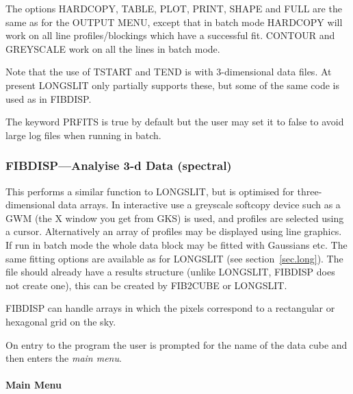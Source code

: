\documentclass[11pt,twoside]{article}
\newcommand{\xlabel}[1]{}
\begin{document}
The options HARDCOPY, TABLE, PLOT, PRINT, SHAPE and FULL are the same
as for the OUTPUT MENU, except that in batch mode HARDCOPY
will work on all line profiles/blockings which have a successful fit.
CONTOUR and GREYSCALE work on all the lines in batch mode.

Note that the use of TSTART and TEND is with 3-dimensional data files.
At present LONGSLIT only partially supports these, but some of the same
code is used as in FIBDISP.

The keyword PRFITS is true by default but the user may set it to false
to avoid large log files when running in batch.

\subsubsection{\xlabel{fibdispanalyise_3d_data_spectral}%
FIBDISP---Analyise 3-d Data (spectral)}

This performs a similar function to LONGSLIT, but is optimised for
three-dimensional data arrays.
In interactive use a greyscale softcopy device such as a GWM (the X
window you get from GKS) is used, and profiles are selected using a cursor.
Alternatively an
array of profiles may be displayed using line graphics. If run in batch
mode the whole data block may be fitted with Gaussians etc. The same
fitting options are available as for LONGSLIT (see
section~\ref{sec.long}). The file should already have a results
structure (unlike LONGSLIT, FIBDISP does not create one), this can be
created by FIB2CUBE or LONGSLIT.

FIBDISP can handle arrays in which the pixels correspond to a
rectangular or hexagonal grid on the sky.

On entry to the program the user is prompted for the name of the data
cube and then enters the {\em main menu}.

\paragraph{Main Menu}
\end{document}
